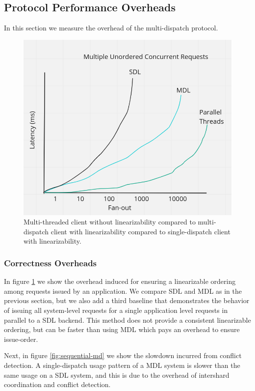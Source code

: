 \subsection{Protocol Performance Overheads}
In this section we measure the overhead of the multi-dispatch protocol.
\begin{figure}[!htb]
\includegraphics[scale=.27]{unordered_multithreaded.png}
\caption{Multi-threaded client without linearizability compared to multi-dispatch client with linearizability compared to single-dispatch client with linearizability.}
\label{fig:unordered-mt}
\end{figure}
\subsubsection{Correctness Overheads}
In figure \ref{fig:unordered-mt} we show the overhead induced for ensuring a linearizable ordering among requests issued by an application. We compare SDL and MDL as in the previous section, but we also add a third baseline that demonstrates the behavior of issuing all system-level requests for a single application level requests in parallel to a SDL backend. This method does not provide a consistent linearizable ordering, but can be faster than using MDL which pays an overhead to ensure issue-order.

Next, in figure \ref{fig:sequential-md} we show the slowdown incurred from conflict detection. A single-dispatch usage pattern of a MDL system is slower than the same usage on a SDL system, and this is due to the overhead of intershard coordination and conflict detection.

